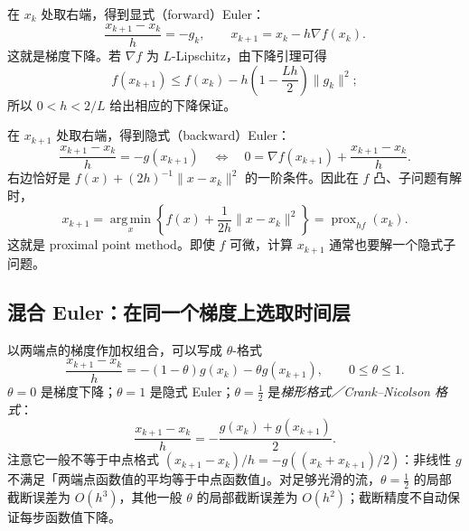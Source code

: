 \documentclass[11pt,a4paper]{ctexart}
\newcommand{\prox}{\operatorname{prox}}
\newcommand{\argmin}{\operatorname*{arg\,min}}
\begin{document}
在 $x_k$ 处取右端，得到显式（forward）Euler：
\begin{equation}\label{eq:gd}
\frac{x_{k+1}-x_k}{h}=-g_k,
\qquad x_{k+1}=x_k-h\nabla f(x_k).
\end{equation}
这就是梯度下降。若 $\nabla f$ 为 $L$-Lipschitz，由下降引理可得
\[
f(x_{k+1})\leq f(x_k)-h\left(1-\frac{Lh}{2}\right)\|g_k\|^2;
\]
所以 $0<h<2/L$ 给出相应的下降保证。

在 $x_{k+1}$ 处取右端，得到隐式（backward）Euler：
\begin{equation}\label{eq:ppa}
\frac{x_{k+1}-x_k}{h}=-g(x_{k+1})
\quad\Longleftrightarrow\quad
0=\nabla f(x_{k+1})+\frac{x_{k+1}-x_k}{h}.
\end{equation}
右边恰好是 $f(x)+(2h)^{-1}\|x-x_k\|^2$ 的一阶条件。因此在 $f$ 凸、子问题有解时，
\begin{equation}\label{eq:prox-f}
x_{k+1}=\argmin_x\left\{f(x)+\frac{1}{2h}\|x-x_k\|^2\right\}
=\prox_{hf}(x_k).
\end{equation}
这就是 proximal point method。即使 $f$ 可微，计算 $x_{k+1}$ 通常也要解一个隐式子问题。

\subsection{混合 Euler：在同一个梯度上选取时间层}
以两端点的梯度作加权组合，可以写成 $\theta$-格式
\begin{equation}\label{eq:theta-g}
\frac{x_{k+1}-x_k}{h}
=-(1-\theta)g(x_k)-\theta g(x_{k+1}),\qquad 0\leq\theta\leq1.
\end{equation}
$\theta=0$ 是梯度下降；$\theta=1$ 是隐式 Euler；$\theta=\tfrac12$ 是\emph{梯形格式／Crank--Nicolson 格式}：
\[
\frac{x_{k+1}-x_k}{h}=-\frac{g(x_k)+g(x_{k+1})}{2}.
\]
注意它一般不等于中点格式 $(x_{k+1}-x_k)/h=-g((x_k+x_{k+1})/2)$：非线性 $g$ 不满足「两端点函数值的平均等于中点函数值」。对足够光滑的流，$\theta=\tfrac12$ 的局部截断误差为 $O(h^3)$，其他一般 $\theta$ 的局部截断误差为 $O(h^2)$；截断精度不自动保证每步函数值下降。
\end{document}
